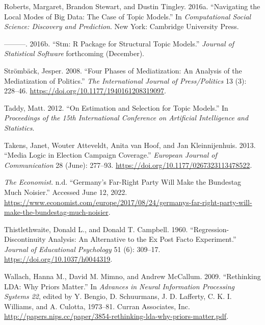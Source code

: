 \documentclass[
  12pt,
]{article}
\newlength{\cslhangindent}
\newlength{\cslentryspacingunit} %
\newenvironment{CSLReferences}[2] %
 {%
  \setlength{\parindent}{0pt}
  \ifodd #1
  \let\oldpar\par
  \def\par{\hangindent=\cslhangindent\oldpar}
  \fi
  \setlength{\parskip}{#2\cslentryspacingunit}
 }%
 {}
\begin{document}
\begin{CSLReferences}{1}{0}
\leavevmode{}%
Roberts, Margaret, Brandon Stewart, and Dustin Tingley. 2016a.
{``Navigating the {Local Modes} of {Big Data}: {The Case} of {Topic
Models}.''} In \emph{Computational {Social Science}: {Discovery} and
{Prediction}}. {New York}: {Cambridge University Press}.

\leavevmode{}%
---------. 2016b. {``Stm: {R Package} for {Structural Topic Models}.''}
\emph{Journal of Statistical Software} forthcoming (December).

\leavevmode{}%
Strömbäck, Jesper. 2008. {``Four {Phases} of {Mediatization}: {An
Analysis} of the {Mediatization} of {Politics}.''} \emph{The
International Journal of Press/Politics} 13 (3): 228--46.
\url{https://doi.org/10.1177/1940161208319097}.

\leavevmode{}%
Taddy, Matt. 2012. {``On Estimation and Selection for Topic Models.''}
In \emph{Proceedings of the 15th {International Conference} on
{Artificial Intelligence} and {Statistics}}.

\leavevmode{}%
Takens, Janet, Wouter Atteveldt, Anita van Hoof, and Jan Kleinnijenhuis.
2013. {``Media Logic in Election Campaign Coverage.''} \emph{European
Journal of Communication} 28 (June): 277--93.
\url{https://doi.org/10.1177/0267323113478522}.

\leavevmode{}%
\emph{The Economist}. n.d. {``Germany's Far-Right Party Will Make the
{Bundestag} Much Noisier.''} Accessed June 12, 2022.
\url{https://www.economist.com/europe/2017/08/24/germanys-far-right-party-will-make-the-bundestag-much-noisier}.

\leavevmode{}%
Thistlethwaite, Donald L., and Donald T. Campbell. 1960.
{``Regression-Discontinuity Analysis: {An} Alternative to the Ex Post
Facto Experiment.''} \emph{Journal of Educational Psychology} 51 (6):
309--17. \url{https://doi.org/10.1037/h0044319}.

\leavevmode{}%
Wallach, Hanna M., David M. Mimno, and Andrew McCallum. 2009.
{``Rethinking {LDA}: {Why Priors Matter}.''} In \emph{Advances in
{Neural Information Processing Systems} 22}, edited by Y. Bengio, D.
Schuurmans, J. D. Lafferty, C. K. I. Williams, and A. Culotta, 1973--81.
{Curran Associates, Inc.}
\url{http://papers.nips.cc/paper/3854-rethinking-lda-why-priors-matter.pdf}.

\end{CSLReferences}
\end{document}
